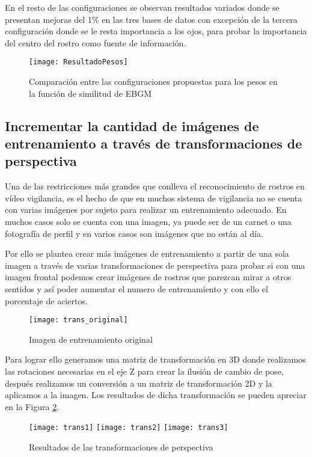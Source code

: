 En el resto de las configuraciones se observan resultados variados donde se presentan mejoras del 1\% en las tres bases de datos con excepción de la tercera configuración donde se le resta importancia a los ojos, para probar la importancia del centro del rostro como fuente de información.

\begin{figure}[ht]
	\centering
	\texttt{[image: ResultadoPesos]}
    \caption{Comparación entre las configuraciones propuestas para los pesos en la función de similitud de \ac{EBGM}}
    \label{im:ResultadoPesos}
\end{figure}

\subsection{Incrementar la cantidad de imágenes de entrenamiento a través de transformaciones de perspectiva} 
Una de las restricciones más grandes que conlleva el reconocimiento de rostros en vídeo vigilancia, es el hecho de que en muchos sistema de vigilancia no se cuenta con varias imágenes por sujeto para realizar un entrenamiento adecuado. En muchos casos solo se cuenta con una imagen, ya puede ser de un carnet o una fotografía de perfil y en varios casos son imágenes que no están al día. 

Por ello se plantea crear más imágenes de entrenamiento a partir de una sola imagen a través de varias transformaciones de perspectiva para probar si con una imagen frontal podemos crear imágenes de rostros que parezcan mirar a otros sentidos y así poder aumentar el numero de entrenamiento y con ello el porcentaje de aciertos.

\begin{figure}[h]
	\centering
	\texttt{[image: trans\_original]}
    \caption{Imagen de entrenamiento original}
\end{figure}

Para lograr ello generamos una matriz de transformación en 3D donde realizamos las rotaciones necesarias en el eje Z para crear la ilusión de cambio de pose, después realizamos un conversión a un matriz de transformación 2D y la aplicamos a la imagen. Los resultados de dicha transformación se pueden apreciar en la Figura \ref{im:Transformacion}.

\begin{figure}[h]
	\centering
	\texttt{[image: trans1]}
    \texttt{[image: trans2]}
    \texttt{[image: trans3]}
    \caption{Resultados de las transformaciones de perspectiva}
    \label{im:Transformacion}
\end{figure}


